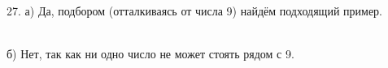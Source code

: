 27. а) Да, подбором (отталкиваясь от числа 9) найдём подходящий пример.
\begin{figure}[ht!]
\end{figure}\\
б) Нет, так как ни одно число не может стоять рядом с 9.\\
